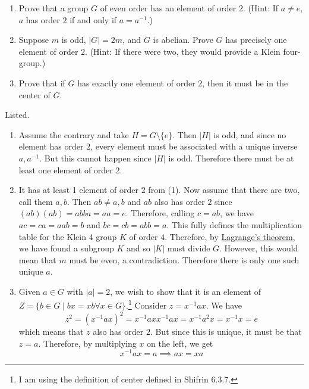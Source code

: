   \begin{exercise}[Shifrin 6.3.17]
    \begin{enumerate}
      \item Prove that a group $G$ of even order has an element of order $2$. (Hint: If $a \neq e$, $a$ has order $2$ if and only if $a = a^{-1}$.)
      \item Suppose $m$ is odd, $|G| = 2m$, and $G$ is abelian. Prove $G$ has precisely one element of order $2$. (Hint: If there were two, they would provide a Klein four-group.)
      \item Prove that if $G$ has exactly one element of order $2$, then it must be in the center of $G$.
    \end{enumerate}
  \end{exercise}
  \begin{solution}
    Listed. 
    \begin{enumerate}
      \item Assume the contrary and take $H = G \setminus \{e\}$. Then $|H|$ is odd, and since no element has order $2$, every element must be associated with a unique inverse $a, a^{-1}$. But this cannot happen since $|H|$ is odd. Therefore there must be at least one element of order $2$. 

      \item It has at least 1 element of order 2 from (1). Now assume that there are two, call them $a, b$. Then $ab \neq a, b$ and $ab$ also has order $2$ since $(ab)(ab) = abba = aa = e$. Therefore, calling $c = ab$, we have $ac = ca = aab = b$ and $bc = cb = abb = a$. This fully defines the multiplication table for the Klein 4 group $K$ of order $4$. Therefore, by \hyperref[thm:lagranges-theorem]{Lagrange's theorem}, we have found a subgroup $K$ and so $|K|$ must divide $G$. However, this would mean that $m$ must be even, a contradiction. Therefore there is only one such unique $a$. 

      \item Given $a \in G$ with $|a| = 2$, we wish to show that it is an element of $Z = \{ b \in G \mid bx = xb \forall x \in G\}$.\footnote{I am using the definition of center defined in Shifrin 6.3.7.} Consider $z = x^{-1} a x$. We have 
      \begin{equation}
        z^2 = (x^{-1} a x)^2 = x^{-1} a x x^{-1} a x = x^{-1} a^2 x = x^{-1} x = e
      \end{equation}
      which means that $z$ also has order $2$. But since this is unique, it must be that $z = a$. Therefore, by multiplying $x$ on the left, we get 
      \begin{equation}
        x^{-1} a x = a \implies ax = xa
      \end{equation}
    \end{enumerate}
  \end{solution}
  
